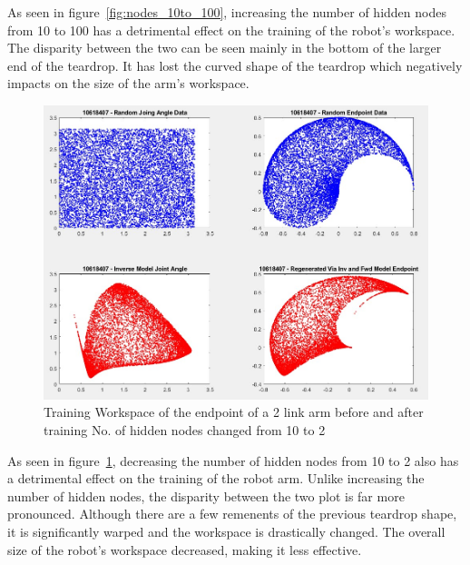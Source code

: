 \documentclass [11pt]{article}
\begin{document}
As seen in figure~\ref{fig:nodes_10to_100}, increasing the number of hidden nodes from 10 to 100 has a detrimental effect on the training of the robot's workspace. The disparity between the two can be seen mainly in the bottom of the larger end of the teardrop. It has lost the curved shape of the teardrop which negatively impacts on the size of the arm’s workspace.

\begin{figure}[H]
\centerline{\includegraphics[width=15cm]{training_workspace_of_the_endpoint-of_a_2-link_arm_2_hidden_layers}}
\caption{Training Workspace of the endpoint of a 2 link arm before and after training No. of hidden nodes changed from 10 to 2}
\label{fig:nodes_10to_2}
\end{figure}

As seen in figure~\ref{fig:nodes_10to_2}, decreasing the number of hidden nodes from 10 to 2 also has a detrimental effect on the training of the robot arm. Unlike increasing the number of hidden nodes, the disparity between the two plot is far more pronounced. Although there are a few remenents of the previous teardrop shape, it is significantly warped and the workspace is drastically changed. The overall size of the robot's workspace decreased, making it less effective.
\end{document}
